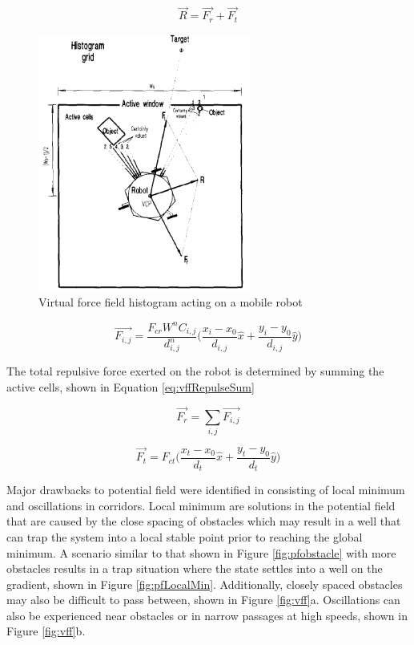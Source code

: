 \documentclass[numbered,pdftex]{ohio-etd}
\begin{document}
\begin{equation}\label{eq:vffHeading}
\overrightarrow{R} = \overrightarrow{F_r} + \overrightarrow{F_t}
\end{equation} 



\begin{figure}[H]
	\centering
	\includegraphics[width=7cm]{PaperFigures/histogram}
	\caption{Virtual force field histogram acting on a mobile robot \cite{borenstein_vector_1991}}
	\label{fig:histogram}
\end{figure}

\begin{equation}\label{eq:vffRepulse}
\overrightarrow{F_{i,j}} = \frac{F_{cr}W^nC_{i,j}}{d^n_{i,j}} \bigg( \frac{x_i-x_0}{d_{i,j}}\hat{x} + \frac{y_i-y_0}{d_{i,j}}\hat{y}\bigg)
\end{equation}

\noindent
The total repulsive force exerted on the robot is determined by summing the active cells, shown in Equation \ref{eq:vffRepulseSum}


\begin{equation}\label{eq:vffRepulseSum}
\overrightarrow{F_r} = \sum_{i,j}\overrightarrow{F_{i,j}}
\end{equation}


\begin{equation}\label{eq:vffGoal}
\overrightarrow{F_t} = F_{ct} \bigg( \frac{x_t-x_0}{d_{t}}\hat{x} + \frac{y_t-y_0}{d_{t}}\hat{y}\bigg)
\end{equation}


Major drawbacks to potential field were identified in \cite{koren_potential_1991} consisting of local minimum and oscillations in corridors. Local minimum are solutions in the potential field that are caused by the close spacing of obstacles which may result in a well that can trap the system into a local stable point prior to reaching the global minimum. A scenario similar to that shown in Figure \ref{fig:pfobstacle} with more obstacles results in a trap situation where the state settles into a well on the gradient, shown in Figure \ref{fig:pfLocalMin}. Additionally, closely spaced obstacles may also be difficult to pass between, shown in Figure \ref{fig:vff}a. Oscillations can also be experienced near obstacles or in narrow passages at high speeds, shown in Figure \ref{fig:vff}b.
\end{document}
